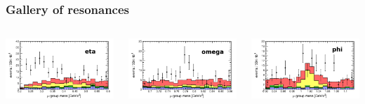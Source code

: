\documentclass[compress]{beamer}
\begin{document}
\begin{frame}
\frametitle{Gallery of resonances}

\begin{columns}
\includegraphics[width=\linewidth]{Mu5_mass_eta.png}

\includegraphics[width=\linewidth]{Mu5_mass_omg.png}

\includegraphics[width=\linewidth]{Mu5_mass_phi.png}


\end{columns}
\end{frame}
\end{document}
